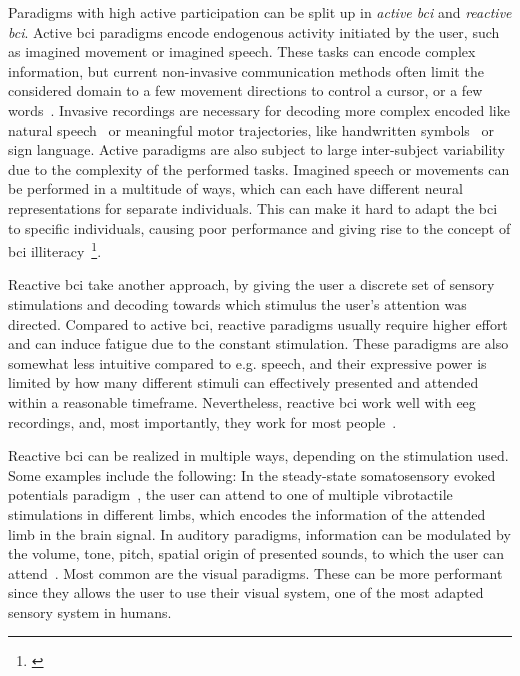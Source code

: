 Paradigms with high active participation can be split up in \emph{active
\ac{bci}} and \emph{reactive \ac{bci}}.
Active \ac{bci} paradigms encode endogenous activity initiated by the user,
such as imagined movement or imagined speech.
These tasks can encode complex information, but current non-invasive
communication methods often limit the considered domain to a few movement
directions to control a cursor, or a few words~\cite{Panachakel2021}.
Invasive recordings are necessary for decoding more complex encoded
like natural speech~\cite{Metzger2023} or meaningful motor trajectories, like handwritten
symbols~\cite{Willett2021} or sign language.
Active paradigms are also subject to large inter-subject variability due to the
complexity of the performed tasks.
Imagined speech or movements can be performed in a multitude of ways, which
can each have different neural representations for separate individuals.
This can make it hard to adapt the \ac{bci} to specific individuals, causing
poor performance and giving rise to the concept of \ac{bci}
illiteracy~\cite{Allison2010}\footnote{
  \cite{Becker2022,Thompson2019}
}.

Reactive \ac{bci} take another approach, by giving the user a discrete set of
sensory stimulations and decoding towards which stimulus the user's attention
was directed.
Compared to active \ac{bci}, reactive paradigms usually require higher effort
and can induce fatigue due to the constant stimulation.
These paradigms are also somewhat less intuitive compared to e.g. speech, and
their expressive power is limited by how many different stimuli can effectively
presented and attended within a reasonable timeframe.
Nevertheless, reactive \ac{bci} work well with \ac{eeg} recordings, and, most
importantly, they work for most people~\cite{Allison2010a,Edlinger2014}.

Reactive \ac{bci} can be realized in multiple ways, depending on the
stimulation used.
Some examples include the following:
In the steady-state somatosensory evoked potentials paradigm~\cite{Petit2021},
the user can attend to one of multiple vibrotactile stimulations in different
limbs, which encodes the information of the attended limb in the brain signal.
In auditory paradigms, information can be modulated by the volume, tone, pitch,
spatial origin of presented sounds, to which the user can
attend~\cite{Kaongoen2017}.
Most common are the visual paradigms.
These can be more performant since they allows the user to use their visual
system, one of the most adapted sensory system in humans.

